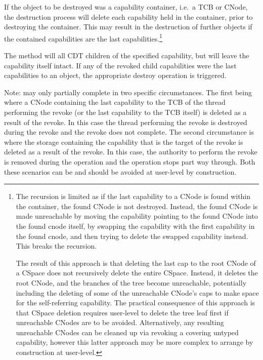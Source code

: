 If the object to be destroyed was a capability container, i.e.\ a TCB
or CNode, the destruction process will delete each capability held in
the container, prior to destroying the container. This may result in
the destruction of further objects if the contained capabilities are
the last capabilities.\footnote{The recursion is limited as if the last
capability to a CNode is found within the container, the found CNode
is not destroyed. Instead, the found CNode is made unreachable by
moving the capability pointing to the found CNode into the found cnode
itself, by swapping the capability with the first capability in the
found cnode, and then trying to delete the swapped capability
instead. This breaks the recursion.

The result of this approach is that deleting the last cap to the root
CNode of a CSpace does not recursively delete the entire
CSpace. Instead, it deletes the root CNode, and the branches of the
tree become unreachable, potentially including the deleting of some of
the unreachable CNode's caps to make space for the self-referring
capability. The practical consequence of this approach is that CSpace
deletion requires user-level to delete the tree leaf first if
unreachable CNodes are to be avoided. Alternatively, any resulting
unreachable CNodes can be cleaned up via revoking a covering untyped
capability, however this latter approach may be more complex to
arrange by construction at user-level.}

The  method will
 all CDT children of the
specified capability, but will leave the capability itself intact. If
any of the revoked child capabilities were the last capabilities to an
object, the appropriate destroy operation is triggered.

Note:  may only partially
complete in two specific circumstances. The first being where a
CNode containing the last capability to the TCB of the thread
performing the revoke (or the last capability to the TCB itself) is
deleted as a result of the revoke. In this case the thread performing
the revoke is destroyed during the revoke and the revoke does not
complete. The second circumstance is where the storage containing the
capability that is the target of the revoke is deleted as a result of
the revoke. In this case, the authority to perform the revoke is
removed during the operation and the operation stops part way
through. Both these scenarios can be and should be avoided at
user-level by construction.

